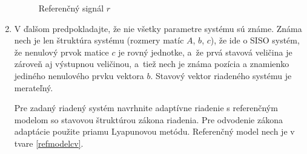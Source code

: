 \documentclass[a4paper, 10pt, ]{article}
\begin{document}
\begin{enumerate}[leftmargin=0pt, labelsep=4mm, itemsep=0pt]
    \begin{figure}[!t]
    	\centering



        \vspace{-5mm}

    	\caption{Referenčný signál $r$}
    	\label{Referenčný sigál $r$ 4cv}


    \end{figure}


















    \item V ďalšom predpokladajte, že nie všetky parametre systému sú známe. Známa nech je len štruktúra systému (rozmery matíc $A$, $b$, $c$), že ide o SISO systém, že nenulový prvok matice $c$ je rovný jednotke, a~že prvá stavová veličina je zároveň aj výstupnou veličinou, a~tiež nech je známa pozícia a znamienko jediného nenulového prvku vektora $b$. Stavový vektor riadeného systému je merateľný.

    Pre zadaný riadený systém navrhnite adaptívne riadenie s referenčným modelom so stavovou štruktúrou zákona riadenia. Pre odvodenie zákona adaptácie použite priamu Lyapunovou metódu. Referenčný model nech je v tvare \eqref{refmodelcv}.


\end{enumerate}
\end{document}
